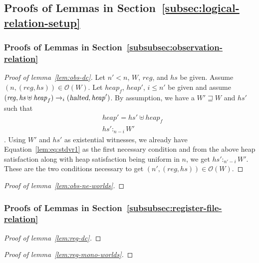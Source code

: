 \documentclass[a4paper]{article}
\newcommand{\var}[1]{\mathit{#1}}
\newcommand{\hs}{\var{hs}}
\newcommand{\reg}{\var{reg}}
\newcommand{\heap}{\var{heap}}
\newcommand{\halted}{\textsl{halted}}
\newcommand{\future}{\mathbin{\sqsupseteq}}
\newcommand{\heapSat}[3][\heap]{#1 :_{#2} #3}
\newcommand{\asmType}{\plaindom{AsmType}}
\newcommand{\plaindom}[1]{\mathrm{#1}}
\newcommand{\intr}[2]{\mathcal{#1}}
\newcommand{\valueintr}[1]{\intr{V}{#1}}
\newcommand{\stdvr}{\valueintr{\asmType}}
\newcommand{\observations}{\mathcal{O}}
\newcommand{\npair}[2][n]{\left(#1,#2 \right)}
\newcommand{\step}[1][]{\rightarrow_{#1}}
\begin{document}
\begin{appendices}
\subsection{Proofs of Lemmas in Section~\ref{subsec:logical-relation-setup}}
\subsubsection{Proofs of Lemmas in Section~\ref{subsubsec:observation-relation}}
\begin{proof}[Proof of lemma~\ref{lem:obs-dc}]
  Let $n' < n$, $W$, $\reg$, and $\hs$ be given. Assume $\npair{(\reg,\hs)} \in \observations(W)$. Let $\heap_f$, $heap'$, $i \leq n'$ be given and assume $(\reg, \hs \uplus \heap_f) \step[i] (\halted, \heap')$. By assumption, we have a $W' \future W$ and $\hs'$ such that
  \begin{align}
&\heap' = \hs' \uplus \heap_f \label{lem:eq:stdvr1}\\
&\heapSat[\hs']{n-i}{W'}\label{lem:eq:stdvr2}
  \end{align}. 
Using $W'$ and $\hs'$ as existential witnesses, we already have Equation~\ref{lem:eq:stdvr1} as the first necessary condition and from the above heap satisfaction along with heap satisfaction being uniform in $n$, we get $\heapSat[\hs']{n'-i}{W'}$. These are the two conditions necessary to get $\npair[n']{(\reg,\hs)} \in \observations(W)$.
\end{proof}

\begin{proof}[Proof of lemma~\ref{lem:obs-ne-worlds}]
\end{proof}

\subsubsection{Proofs of Lemmas in Section~\ref{subsubsec:register-file-relation}}
\begin{proof}[Proof of lemma~\ref{lem:reg-dc}]
\end{proof}

\begin{proof}[Proof of lemma~\ref{lem:reg-mono-worlds}]
\end{proof}


\end{appendices}
\end{document}
